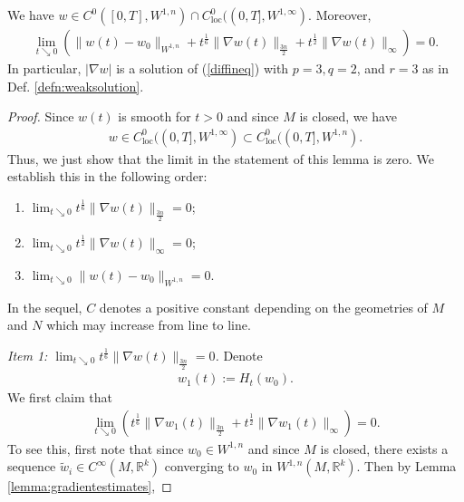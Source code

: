 \documentclass[10pt,a4paper]{amsart}
\newcommand{\R}{{\mathbb R}}
\begin{document}
\begin{lemma}\label{lemma:checkinghmfisMorreysolution}
    We have \(w \in C^0([0, T], W^{1, n}) \cap C_{\text{loc}}^0((0, T], W^{1, \infty})\). Moreover, 
    \begin{align*}
        \lim_{t \searrow 0} \left(\|w(t) - w_0\|_{W^{1, n}} + t^{\frac{1}{6}}\|\nabla w(t)\|_{\frac{3n}{2}} + t^{\frac{1}{2}}\|\nabla w(t)\|_{\infty}\right) = 0.
    \end{align*} In particular, \(|\nabla w|\) is a solution of (\ref{diffineq}) with \(p = 3, q = 2\), and \(r = 3\) as in Def. \ref{defn:weaksolution}.
\end{lemma}

\begin{proof}
   
   Since \(w(t)\) is smooth for \(t > 0\) and since \(M\) is closed, we have
   \begin{align*}
       w \in C_{\text{loc}}^0((0, T], W^{1, \infty}) \subset C_{\text{loc}}^0((0, T], W^{1, n}).
   \end{align*} Thus, we just show that the limit in the statement of this lemma is zero. We establish this in the following order:
   \begin{enumerate}
       \item \(\lim_{t \searrow 0} t^{\frac{1}{6}} \|\nabla w(t)\|_{\frac{3n}{2}} = 0\); 
       \item \(\lim_{t \searrow 0} t^{\frac{1}{2}} \|\nabla w(t)\|_\infty = 0\); 
       \item \(\lim_{t \searrow 0} \|w(t) - w_0\|_{W^{1, n}} = 0\).
   \end{enumerate}\par
   In the sequel, \(C\) denotes a positive constant depending on the geometries of \(M\) and \(N\) which may increase from line to line. \par
   \emph{Item 1: \(\lim_{t \searrow 0} t^{\frac{1}{6}} \|\nabla w(t)\|_{\frac{3n}{2}} = 0\).}
   Denote
   \begin{align*}
       w_1(t) := H_t(w_0).
   \end{align*} We first claim that
   \begin{align}\label{checkinghmfisMorreysolution:goestozero}
      \lim_{t \searrow 0} \left(t^{\frac{1}{6}} \|\nabla w_1(t)\|_{\frac{3n}{2}} + t^{\frac{1}{2}}\|\nabla w_1(t)\|_\infty\right) = 0. 
   \end{align} To see this, first note that since \(w_0 \in W^{1, n}\) and since \(M\) is closed, there exists a sequence \(\tilde{w}_i \in C^\infty(M, \R^k)\) converging to \(w_0\) in \(W^{1, n}(M, \R^k)\). Then by Lemma \ref{lemma:gradientestimates},

\end{proof}
\end{document}
